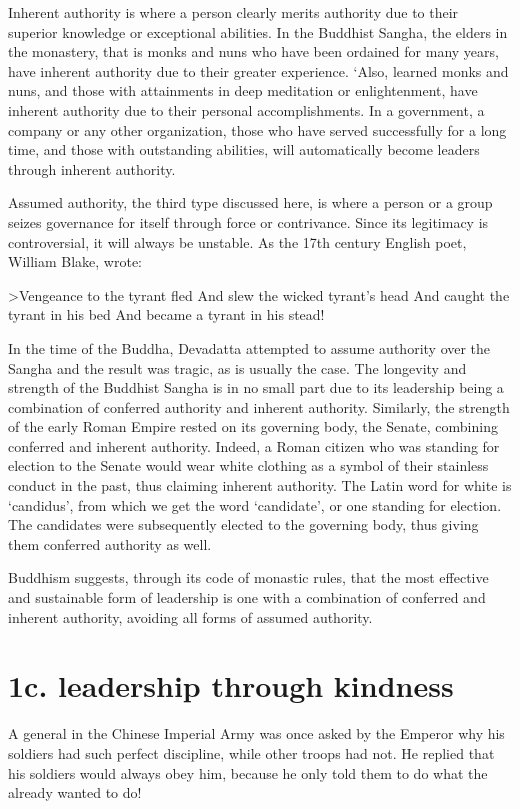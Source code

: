 \documentclass[12pt, openany]{book}
\begin{document}
Inherent authority is where a person clearly merits authority due to their superior knowledge or exceptional abilities. In the Buddhist Sangha, the elders in the monastery, that is monks and nuns who have been ordained for many years, have inherent authority due to their greater experience. ‘Also, learned monks and nuns, and those with attainments in deep meditation or enlightenment, have inherent authority due to their personal accomplishments. In a government, a company or any other organization, those who have served successfully for a long time, and those with outstanding abilities, will automatically become leaders through inherent authority.

Assumed authority, the third type discussed here, is where a person or a group seizes governance for itself through force or contrivance. Since its legitimacy is controversial, it will always be unstable. As the 17th century English poet, William Blake, wrote:

>Vengeance to the tyrant fled
And slew the wicked tyrant’s head
And caught the tyrant in his bed
And became a tyrant in his stead!

In the time of the Buddha, Devadatta attempted to assume authority over the Sangha and the result was tragic, as is usually the case. The longevity and strength of the Buddhist Sangha is in no small part due to its leadership being a combination of conferred authority and inherent authority. Similarly, the strength of the early Roman Empire rested on its governing body, the Senate, combining conferred and inherent authority. Indeed, a Roman citizen who was standing for election to the Senate would wear white clothing as a symbol of their stainless conduct in the past, thus claiming inherent authority. The Latin word for white is ‘candidus’, from which we get the word ‘candidate’, or one standing for election. The candidates were subsequently elected to the governing body, thus giving them conferred authority as well.

Buddhism suggests, through its code of monastic rules, that the most effective and sustainable form of leadership is one with a combination of conferred and inherent authority, avoiding all forms of assumed authority.

\section{1c. leadership through kindness}
A general in the Chinese Imperial Army was once asked by the Emperor why his soldiers had such perfect discipline, while other troops had not. He replied that his soldiers would always obey him, because he only told them to do what the already wanted to do!
\end{document}
